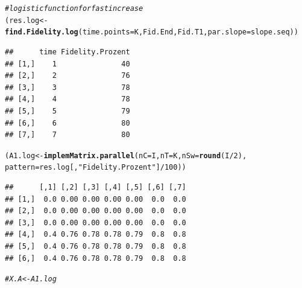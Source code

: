 \documentclass{article}\usepackage[]{graphicx}\usepackage[]{color}
\makeatletter
\newcommand{\hlnum}[1]{\textcolor[rgb]{0.686,0.059,0.569}{#1}}%
\newcommand{\hlstr}[1]{\textcolor[rgb]{0.192,0.494,0.8}{#1}}%
\newcommand{\hlcom}[1]{\textcolor[rgb]{0.678,0.584,0.686}{\textit{#1}}}%
\newcommand{\hlopt}[1]{\textcolor[rgb]{0,0,0}{#1}}%
\newcommand{\hlstd}[1]{\textcolor[rgb]{0.345,0.345,0.345}{#1}}%
\newcommand{\hlkwb}[1]{\textcolor[rgb]{0.69,0.353,0.396}{#1}}%
\newcommand{\hlkwc}[1]{\textcolor[rgb]{0.333,0.667,0.333}{#1}}%
\newcommand{\hlkwd}[1]{\textcolor[rgb]{0.737,0.353,0.396}{\textbf{#1}}}%
\newenvironment{kframe}{%
 \def\at@end@of@kframe{}%
 \ifinner\ifhmode%
  \def\at@end@of@kframe{\end{minipage}}%
  \begin{minipage}{\columnwidth}%
 \fi\fi%
 \def\FrameCommand##1{\hskip\@totalleftmargin \hskip-\fboxsep
 \colorbox{shadecolor}{##1}\hskip-\fboxsep
     \hskip-\linewidth \hskip-\@totalleftmargin \hskip\columnwidth}%
 \MakeFramed {\advance\hsize-\width
   \@totalleftmargin\z@ \linewidth\hsize
   \@setminipage}}%
 {\par\unskip\endMakeFramed%
 \at@end@of@kframe}
\newenvironment{knitrout}{}{} %
\makeatother
\begin{document}
\begin{knitrout}
\begin{kframe}
\begin{alltt}
\hlcom{#logistic function for fast increase}
\hlstd{(res.log}\hlkwb{<-}\hlkwd{find.Fidelity.log}\hlstd{(}\hlkwc{time.points}\hlstd{=K, Fid.End, Fid.T1,} \hlkwc{par.slope}\hlstd{=slope.seq))}
\end{alltt}
\begin{verbatim}
##      time Fidelity.Prozent
## [1,]    1               40
## [2,]    2               76
## [3,]    3               78
## [4,]    4               78
## [5,]    5               79
## [6,]    6               80
## [7,]    7               80
\end{verbatim}
\begin{alltt}
\hlstd{(A1.log} \hlkwb{<-}\hlkwd{implemMatrix.parallel}\hlstd{(}\hlkwc{nC}\hlstd{=I,} \hlkwc{nT}\hlstd{=K,} \hlkwc{nSw}\hlstd{=}\hlkwd{round}\hlstd{(I}\hlopt{/}\hlnum{2}\hlstd{),}
                                \hlkwc{pattern}\hlstd{=res.log[,}\hlstr{"Fidelity.Prozent"}\hlstd{]}\hlopt{/}\hlnum{100}\hlstd{))}
\end{alltt}
\begin{verbatim}
##      [,1] [,2] [,3] [,4] [,5] [,6] [,7]
## [1,]  0.0 0.00 0.00 0.00 0.00  0.0  0.0
## [2,]  0.0 0.00 0.00 0.00 0.00  0.0  0.0
## [3,]  0.0 0.00 0.00 0.00 0.00  0.0  0.0
## [4,]  0.4 0.76 0.78 0.78 0.79  0.8  0.8
## [5,]  0.4 0.76 0.78 0.78 0.79  0.8  0.8
## [6,]  0.4 0.76 0.78 0.78 0.79  0.8  0.8
\end{verbatim}
\begin{alltt}
\hlcom{#X.A<-A1.log }


\end{alltt}
\end{kframe}
\end{knitrout}
\end{document}
